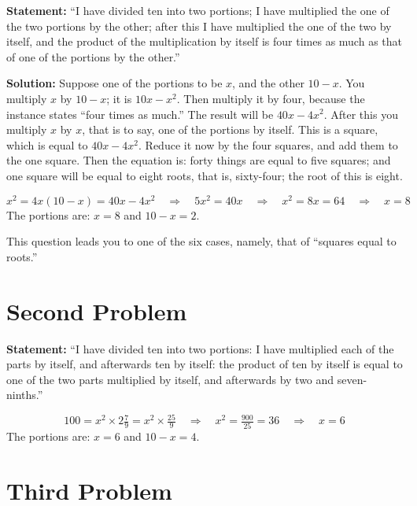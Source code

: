\documentclass[11pt,a4paper,openany,oneside]{book}
\begin{document}
\textbf{Statement:} ``I have divided ten into two portions; I have multiplied
the one of the two portions by the other; after this I have multiplied the
one of the two by itself, and the product of the multiplication by itself is
four times as much as that of one of the portions by the other.''

\textbf{Solution:} Suppose one of the portions to be $x$, and the other $10 - x$.
You multiply $x$ by $10 - x$; it is $10x - x^2$. Then multiply it by four,
because the instance states ``four times as much.'' The result will be $40x -
4x^2$. After this you multiply $x$ by $x$, that is to say, one of the
portions by itself. This is a square, which is equal to $40x - 4x^2$.
Reduce it now by the four squares, and add them to the one square. Then the
equation is: forty things are equal to five squares; and one square will be
equal to eight roots, that is, sixty-four; the root of this is eight.

\begin{mathbox}
\begin{equation}
x^2 = 4x(10-x) = 40x - 4x^2 \quad\Rightarrow\quad 5x^2 = 40x \quad\Rightarrow\quad x^2 = 8x = 64 \quad\Rightarrow\quad x = 8
\end{equation}
The portions are: $x = 8$ and $10 - x = 2$.
\end{mathbox}

This question leads you to one of the six cases, namely, that of ``squares
equal to roots.''

\section*{Second Problem}

\textbf{Statement:} ``I have divided ten into two portions: I have multiplied
each of the parts by itself, and afterwards ten by itself: the product of ten
by itself is equal to one of the two parts multiplied by itself, and
afterwards by two and seven-ninths.''

\begin{mathbox}
\begin{equation}
100 = x^2 \times 2\tfrac{7}{9} = x^2 \times \tfrac{25}{9} \quad\Rightarrow\quad
x^2 = \tfrac{900}{25} = 36 \quad\Rightarrow\quad x = 6
\end{equation}
The portions are: $x = 6$ and $10 - x = 4$.
\end{mathbox}

\section*{Third Problem}
\end{document}
